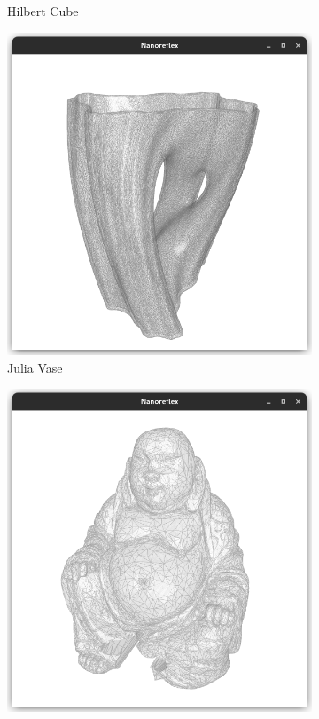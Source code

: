 \documentclass{stdlocal}
\begin{document}
\begin{figure}
\begin{subfigure}[b]{0.23\linewidth}
      \caption{Hilbert Cube}
    \end{subfigure}
    \hfill
    \begin{subfigure}[b]{0.23\linewidth}
      \centering
      \includegraphics[width=\linewidth,trim={25px 20 25 50},clip]{images/polyhedral-surface-julia-vase.png}
      \caption{Julia Vase}
    \end{subfigure}
    \hfill
    \begin{subfigure}[b]{0.23\linewidth}
      \centering
      \includegraphics[width=\linewidth,trim={25px 20 25 50},clip]{images/polyhedral-surface-buddha.png}

\end{subfigure}
\end{figure}
\end{document}
